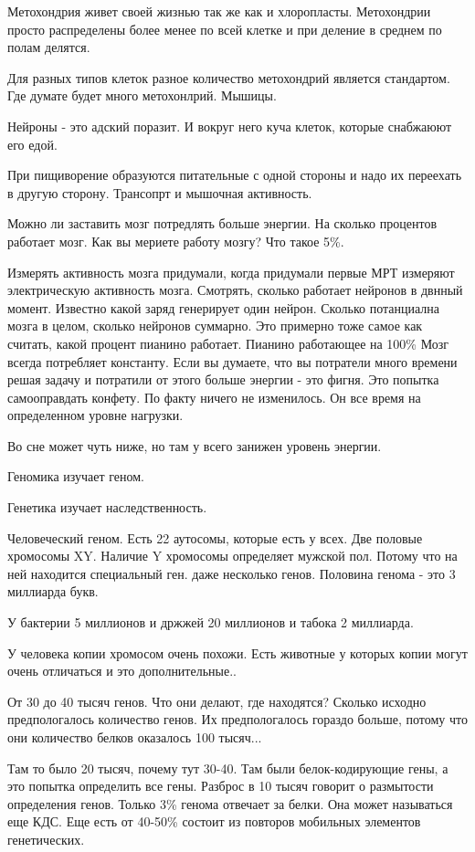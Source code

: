 Метохондрия живет своей жизнью так же как и хлоропласты. Метохондрии 
просто распределены более менее по всей клетке и при деление 
в среднем по полам делятся. 

Для разных типов клеток разное количество метохондрий является стандартом. 
Где думате будет много метохонлрий. Мышицы. 

Нейроны - это адский поразит. И вокруг него куча клеток, которые снабжаюют его едой. 

При пищиворение образуются питательные с одной стороны и надо их 
переехать в другую сторону. Трансопрт и мышочная активность. 

Можно ли заставить мозг потредлять больше энергии. 
На сколько процентов работает мозг. Как вы мериете работу мозгу? Что такое 
5\%. 

Измерять активность мозга придумали, когда придумали первые МРТ измеряют 
электрическую активность мозга. Смотрять, сколько работает нейронов в двнный момент. 
Известно какой заряд генерирует один нейрон. Сколько потанциална мозга в целом, сколько
нейронов суммарно. Это примерно тоже самое как считать, какой 
процент пианино работает. Пианино работающее на 100\% Мозг всегда потребляет константу. 
Если вы думаете, что вы потратели много времени решая задачу и потратили от этого 
больше энергии - это фигня. Это попытка самооправдать конфету. По 
факту ничего не изменилось. Он все время на определенном уровне нагрузки. 

Во сне может чуть ниже, но там у всего занижен уровень энергии. 

Геномика изучает геном.  

Генетика изучает наследственность.

Человеческий геном. Есть 22 аутосомы, которые есть у всех. Две половые хромосомы XY.
Наличие Y хромосомы определяет мужской пол. Потому что на ней находится
специальный ген. даже несколько генов. Половина генома - это 3 миллиарда букв.

У бактерии 5 миллионов и држжей 20 миллионов и табока 2 миллиарда.

У человека копии хромосом очень похожи. Есть животные у которых копии
могут очень отличаться и это дополнительные..

От 30 до 40 тысяч генов. Что они делают, где находятся?
Сколько исходно предпологалось количество генов. Их
предпологалось гораздо больше, потому что они количество белков
оказалось 100 тысяч...

Там то было 20 тысяч, почему тут 30-40. Там были белок-кодирующие
гены, а это попытка определить все гены. Разброс в 10 тысяч говорит
о размытости определения генов. Только 3\% генома отвечает
за белки. Она может называться еще КДС. Еще
есть от 40-50\% состоит из повторов мобильных
элементов генетических.


